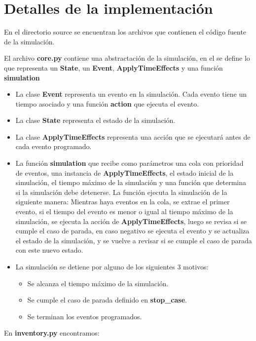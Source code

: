 \documentclass{article}
\begin{document}
\section*{Detalles de la implementación}

En el directorio source se encuentran los archivos que contienen el código fuente de la simulación. 

El archivo \textbf{core.py}  contiene una abstractación de la simulación, en el se define lo que representa un \textbf{State}, un \textbf{Event}, \textbf{ApplyTimeEffects} y una función \textbf{simulation}

\begin{itemize}
    \item La clase \textbf{Event} representa un evento en la simulación. Cada evento tiene un tiempo asociado y una función \textbf{action} que ejecuta el evento.
    \item La clase \textbf{State} representa el estado de la simulación.
    \item La clase \textbf{ApplyTimeEffects} representa una acción que se ejecutará antes de cada evento programado.
    \item La función \textbf{simulation} que recibe como parámetros una cola con prioridad de eventos, una instancia de \textbf{ApplyTimeEffects},
  el estado
  inicial de la simulación, el tiempo máximo de la simulación y una función que determina si la simulación debe
  detenerse. La función ejecuta la simulación de la siguiente manera:
  Mientras haya eventos en la cola, se extrae el primer evento, si el tiempo del evento es menor o igual al tiempo
  máximo de la simulación, se ejecuta la acción de \textbf{ApplyTimeEffects}, luego se revisa si se cumple el caso de parada, en caso
  negativo se ejecuta el evento y se actualiza el estado de la simulación, y se vuelve a revisar si se cumple el caso de
  parada con este nuevo estado.
  \item La simulación se detiene por alguno de los siguientes 3 motivos:
    \begin{itemize}
        \item Se alcanza el tiempo máximo de la simulación.
        \item Se cumple el caso de parada definido en \textbf{stop\_case}.
        \item Se terminan los eventos programados.
    \end{itemize}
\end{itemize}

En \textbf{inventory.py} encontramos:
\end{document}
